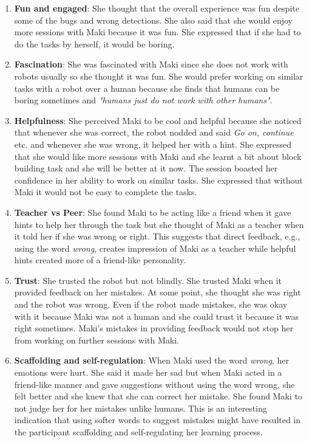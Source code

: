 \begin{enumerate}
    \item \textbf{Fun and engaged}: She thought that the overall experience was fun despite some of the bugs and wrong detections. She also said that she would enjoy more sessions with Maki because it was fun. She expressed that if she had to do the tasks by herself, it would be boring.
    \item \textbf{Fascination}: She was fascinated with Maki since she does not work with robots usually so she thought it was fun. She would prefer working on similar tasks with a robot over a human because she finds that humans can be boring sometimes and \emph{"humans just do not work with other humans"}.
    \item \textbf{Helpfulness}: She perceived Maki to be cool and helpful because she noticed that whenever she was correct, the robot nodded and said \emph{Go on, continue} etc. and whenever she was wrong, it helped her with a hint. She expressed that she would like more sessions with Maki and she learnt a bit about block building task and she will be better at it now. The session boasted her confidence in her ability to work on similar tasks. She expressed that without Maki it would not be easy to complete the tasks.
    \item \textbf{Teacher vs Peer}: She found Maki to be acting like a friend when it gave hints to help her through the task but she thought of Maki as a teacher when it told her if she was wrong or right. This suggests that direct feedback, e.g., using the word \emph{wrong}, creates impression of Maki as a teacher while helpful hints created more of a friend-like personality. 
    \item \textbf{Trust}: She trusted the robot but not blindly. She trusted Maki when it provided feedback on her mistakes. At some point, she thought she was right and the robot was wrong. Even if the robot made mistakes, she was okay with it because Maki was not a human and she could trust it because it was right sometimes. Maki's mistakes in providing feedback would not stop her from working on further sessions with Maki. 
    \item \textbf{Scaffolding and self-regulation}: When Maki used the word \emph{wrong}, her emotions were hurt. She said it made her sad but when Maki acted in a friend-like manner and gave suggestions without using the word wrong, she felt better and she knew that she can correct her mistake. She found Maki to not judge her for her mistakes unlike humans. This is an interesting indication that using softer words to suggest mistakes might have resulted in the participant scaffolding and self-regulating her learning process. 

\end{enumerate}
